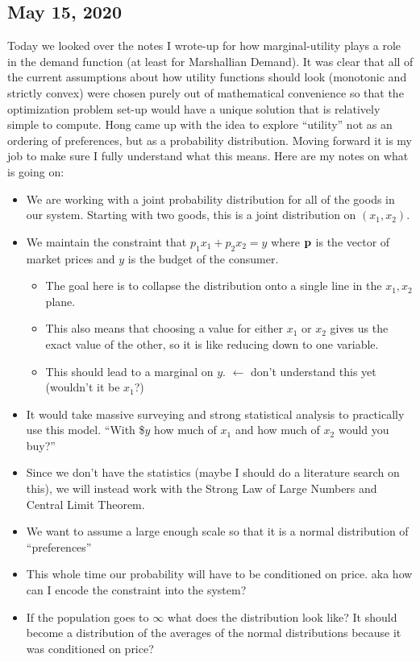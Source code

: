 \subsection{May 15, 2020}
Today we looked over the notes I wrote-up for how marginal-utility plays a role in the demand function (at least for Marshallian Demand). It was clear that all of the current assumptions about how utility functions should look (monotonic and strictly convex) were chosen purely out of mathematical convenience so that the optimization problem set-up would have a unique solution that is relatively simple to compute. Hong came up with the idea to explore ``utility'' not as an ordering of preferences, but as a probability distribution. Moving forward it is my job to make sure I fully understand what this means. Here are my notes on what is going on:
\begin{itemize}
	\item We are working with a joint probability distribution for all of the goods in our system. Starting with two goods, this is a joint distribution on $(x_1, x_2).$
	\item We maintain the constraint that $p_1x_1 + p_2x_2 = y$ where $\mathbf{p}$ is the vector of market prices and $y$ is the budget of the consumer. 
	\begin{itemize}
		\item The goal here is to collapse the distribution onto a single line in the $x_1, x_2$ plane.
		\item This also means that choosing a value for either $x_1$ or $x_2$ gives us the exact value of the other, so it is like reducing down to one variable.
		\item {This should lead to a marginal on $y$.} $\leftarrow$ don't understand this yet (wouldn't it be $x_1$?) 
	\end{itemize}
	\item It would take massive surveying and strong statistical analysis to practically use this model. ``With \$$y$ how much of $x_1$ and how much of $x_2$ would you buy?''
	\item Since we don't have the statistics {(maybe I should do a literature search on this)}, we will instead work with the Strong Law of Large Numbers and Central Limit Theorem. 
	\item We want to assume a large enough scale so that it is a normal distribution of ``preferences''
	\item This whole time our probability will have to be conditioned on price. {aka how can I encode the constraint into the system?}
	\item If the population goes to $\infty$ what does the distribution look like? It should become a distribution of the averages of the normal distributions {because it was conditioned on price?}
\end{itemize}

